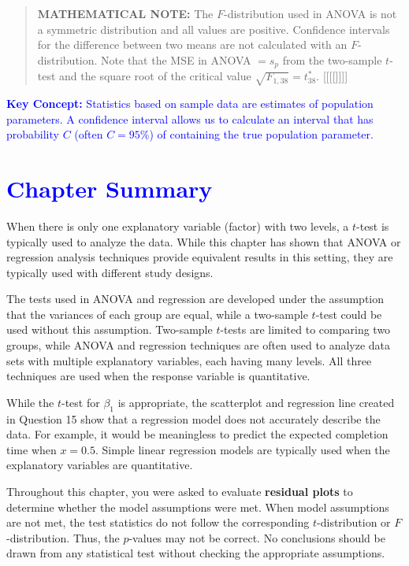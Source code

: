 \documentclass[
]{report}
\begin{document}
\begin{quote}
\textbf{MATHEMATICAL NOTE:} The \(\scriptstyle F\)-distribution used in ANOVA is not a symmetric distribution and all values are positive. Confidence intervals for the difference between two means are not calculated with an \(\scriptstyle F\)-distribution. Note that the MSE in ANOVA \(\scriptstyle = s_p\) from the two-sample \(\scriptstyle t\)-test and the square root of the critical value \(\scriptstyle \sqrt{F_{1,38}} = t^*_{38}\). {[}{[}{[}{[}{]}{]}{]}{]}
\end{quote}

\textbf{\textcolor{blue}{Key Concept:}} \textcolor{blue}{Statistics based on sample data are estimates of population parameters. A confidence interval allows us to calculate an interval that has probability $\scriptstyle C$ (often $\scriptstyle C=95\%$) of containing the true population parameter.}

\hypertarget{section-25}{%
\section{\texorpdfstring{\textcolor{blue}{ Chapter Summary}}{}}\label{section-25}}

When there is only one explanatory variable (factor) with two levels, a \(\scriptstyle t\)-test is typically used to analyze the data. While this chapter has shown that ANOVA or regression analysis techniques provide equivalent results in this setting, they are typically used with different study designs.

The tests used in ANOVA and regression are developed under the assumption that the variances of each group are equal, while a two-sample \(\scriptstyle t\)-test could be used without this assumption. Two-sample \(\scriptstyle t\)-tests are limited to comparing two groups, while ANOVA and regression techniques are often used to analyze data sets with multiple explanatory variables, each having many levels. All three techniques are used when the response variable is quantitative.

While the \(\scriptstyle t\)-test for \(\scriptstyle \beta_1\) is appropriate, the scatterplot and regression line created in Question 15 show that a regression model does not accurately describe the data. For example, it would be meaningless to predict the expected completion time when \(\scriptstyle x = 0.5\). Simple linear regression models are typically used when the explanatory variables are quantitative.

Throughout this chapter, you were asked to evaluate \textbf{residual plots} to determine whether the model assumptions were met. When model assumptions are not met, the test statistics do not follow the corresponding \(\scriptstyle t\)-distribution or \(\scriptstyle F\)-distribution. Thus, the \(\scriptstyle p\)-values may not be correct. No conclusions should be drawn from any statistical test without checking the appropriate assumptions.
\end{document}
